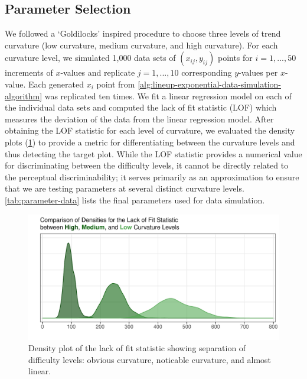 \documentclass[12pt]{article}
\begin{document}
\hypertarget{lineups-parameter-selection}{%
\subsection{Parameter Selection}\label{lineups-parameter-selection}}

We followed a `Goldilocks' inspired procedure to choose three levels of
trend curvature (low curvature, medium curvature, and high curvature).
For each curvature level, we simulated 1,000 data sets of
\((x_{ij}, y_{ij})\) points for \(i = 1,...,50\) increments of
\(x\)-values and replicate \(j = 1,...,10\) corresponding \(y\)-values
per \(x\)-value. Each generated \(x_i\) point from
\cref{alg:lineup-exponential-data-simulation-algorithm} was replicated
ten times. We fit a linear regression model on each of the individual
data sets and computed the lack of fit statistic (LOF) which measures
the deviation of the data from the linear regression model. After
obtaining the LOF statistic for each level of curvature, we evaluated
the density plots (\cref{fig:lof-density-curves}) to provide a metric
for differentiating between the curvature levels and thus detecting the
target plot. While the LOF statistic provides a numerical value for
discriminating between the difficulty levels, it cannot be directly
related to the perceptual discriminability; it serves primarily as an
approximation to ensure that we are testing parameters at several
distinct curvature levels. \cref{tab:parameter-data} lists the final
parameters used for data simulation.

\begin{figure}[tbp]

{\centering \includegraphics[width=1\linewidth,]{logarithmic-lineups_files/figure-latex/lof-density-curves-1} 

}

\caption[Lineup parameter selection]{Density plot of the lack of fit statistic showing separation of difficulty levels: obvious curvature, noticable curvature, and almost linear.}\label{fig:lof-density-curves}
\end{figure}
\end{document}
